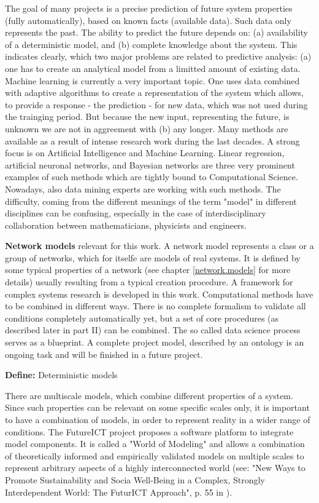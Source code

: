 \documentclass[a4paper,10pt]{scrbook}
\begin{document}
The goal of many projects is a precise prediction of future system properties (fully automatically), based on known facts (available data). Such data only represents the past. The ability to predict the future depends on: (a) availability of a deterministic model, and (b) complete knowledge about the system. This indicates clearly, which two major problems are related to predictive analysis: (a) one has to create an analytical model from a limitted amount of existing data. Machine learning is currently a very important topic. One uses data combined with adaptive algorithms to create a representation of the system which allows, to provide a response - the prediction - for new data, which was not used during the trainging period. But because the new input, representing the future, is unknown we are not in aggreement with (b) any longer. Many methods are available as a result of intense research work during the last decades. A strong focus is on Artificial Intelligence and Machine Learning. Linear regression, artificial neuronal networks, and Bayesian networks are three very prominent examples of such methods which are tightly bound to Computational Science. Nowadays, also data mining experts are working with such methods. The difficulty, coming from the different meanings of the term "model" in different disciplines can be confusing, especially in the case of interdisciplinary collaboration between mathematicians, physicists and engineers. 

\textbf{Network models} relevant for this work. A network model represents a class or a group of networks, which for itselfe are models of real systems. It is defined by some typical properties of a network (see chapter \ref{network.models} for more details) usually resulting from a typical creation procedure. A framework for complex systems research is developed in this work. Computational methods have to be combined in different ways. There is no complete formalism to validate all conditions completely automatically yet, but a set of core procedures (as described later in part II) can be combined. The so called data science process serves as a blueprint. A complete project model, described by an ontology is an ongoing task and will be finished in a future project. 
 
\textbf{Define:} Deterministic models

There are multiscale models, which combine different properties of a system. Since such properties can be relevant on some specific scales only, it is important to have a combination of models, in order to represent reality in a wider range of conditions. The FutureICT project proposes a software platform to integrate model components. It is called a "World of Modeling" and allows a combination of theoretically informed and empirically validated models on multiple scales to represent arbitrary aspects of a highly interconnected world (see: "New	 Ways to Promote Sustainability and Socia Well-Being in a Complex, Strongly Interdependent World: The	FuturICT Approach", p. 55 in \cite{Ball2012}). 
\end{document}
